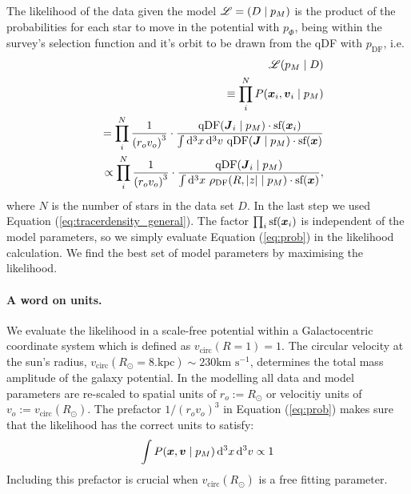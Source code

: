 The likelihood of the data given the model $\mathscr{L} = (D \mid p_M)$ is the product of the probabilities for each star to move in the potential with $p_\Phi$, being within the survey's selection function and it's orbit to be drawn from the qDF with $p_\text{DF}$, i.e. 
\begin{eqnarray}
&&\mathscr{L}(p_M \mid D) \nonumber\\
&&\equiv \prod_i^{N} P(\boldsymbol{x}_i,\boldsymbol{v}_i \mid p_M) \nonumber\\
&&= \prod_i^{N} \frac{1}{\left(r_o v_o\right)^3} \cdot \frac{\text{qDF}(\boldsymbol{J}_i \mid p_M) \cdot \text{sf}(\boldsymbol{x}_i)}{\int \mathop{}\!\mathrm{d^3} x \mathop{}\!\mathrm{d^3} v \  \text{qDF}(\boldsymbol{J} \mid p_M) \cdot \text{sf}(\boldsymbol{x})}\nonumber\\
&&\propto \prod_i^{N} \frac{1}{\left(r_o v_o\right)^3} \cdot \frac{\text{qDF}(\boldsymbol{J}_i \mid p_M)}{\int \mathop{}\!\mathrm{d^3} x \  \rho_\text{DF}(R,|z| \mid p_M) \cdot \text{sf}(\boldsymbol{x})}, \label{eq:prob}
\end{eqnarray}
where $N$ is the number of stars in the data set $D$.
In the last step we used Equation (\ref{eq:tracerdensity_general}). The factor $\prod_i\text{sf}(\boldsymbol{x}_i)$ is independent of the model parameters, so we  simply evaluate Equation (\ref{eq:prob}) in the likelihood calculation. We find the best set of model parameters by maximising the likelihood. 


\paragraph{A word on units.} We evaluate the likelihood in a scale-free potential within a Galactocentric coordinate system which is defined as $v_\text{circ}(R = 1) = 1$. The circular velocity at the sun's radius, $v_\text{circ}(R_\odot = 8. \text{kpc}) \sim 230 \text{km s$^{-1}$}$, determines the total mass amplitude of the galaxy potential. In the modelling all data and model parameters are re-scaled to spatial units of $r_o := R_\odot$ or velocitiy units of $v_o := v_\text{circ}(R_\odot )$. The prefactor $1/\left(r_o v_o\right)^3$ in Equation (\ref{eq:prob}) makes sure that the likelihood has the correct units to satisfy:
\begin{eqnarray*}
\int P(\boldsymbol{x},\boldsymbol{v} \mid p_M) \mathop{}\!\mathrm{d^3} x \mathop{}\!\mathrm{d^3} v \propto 1
\end{eqnarray*} 
Including this prefactor is crucial when $v_\text{circ}(R_\odot )$ is a free fitting parameter.

